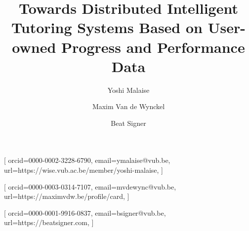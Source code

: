 \documentclass[
]{ceurart}
\begin{document}

\title{Towards Distributed Intelligent Tutoring Systems Based on User-owned Progress and Performance Data}

\author{Yoshi {Malaise}}[%
orcid=0000-0002-3228-6790,
email=ymalaise@vub.be,
url=https://wise.vub.ac.be/member/yoshi-malaise,
] 
\cormark[1]
\author{Maxim {Van de Wynckel}}[%
orcid=0000-0003-0314-7107,
email=mvdewync@vub.be,
url=https://maximvdw.be/profile/card,
]
\author{Beat Signer}[%
orcid=0000-0001-9916-0837,
email=bsigner@vub.be,
url=https://beatsigner.com,
]

\address{Web \& Information Systems Engineering Lab, Vrije Universiteit Brussel, 1050 Brussels, Belgium}



\maketitle





\end{document}
